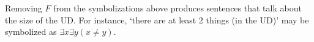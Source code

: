 Removing $F$ from the symbolizations above produces sentences that talk about the size of the UD. For instance, `there are at least 2 things (in the UD)' may be symbolized as $\exists x\exists y(x \neq y)$.


%
%
%
